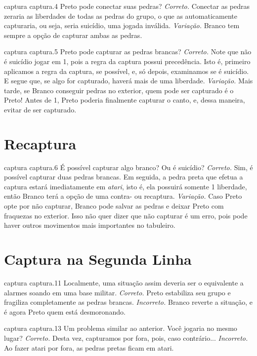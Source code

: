 \emptypage

\problemAnswerDiagram
  {captura}
  {captura.4}
  {Preto pode conectar suas pedras?}
  {\emph{Correto.} Conectar as pedras zeraria as liberdades de todas as pedras do grupo, o que as automaticamente capturaria, ou seja, seria suicídio, uma jogada inválida.}
  {\emph{Variação.} Branco tem sempre a opção de capturar ambas as pedras.}

\problemAnswerDiagram
  {captura}
  {captura.5}
  {Preto pode capturar as pedras brancas?}
  {\emph{Correto.} Note que não é suicídio jogar em 1, pois a regra da captura possui precedência. Isto é, primeiro aplicamos a regra da captura, se possível, e, só depois, examinamos se é suicídio. E segue que, se algo for capturado, haverá mais de uma liberdade.}
  {\emph{Variação.} Mais tarde, se Branco conseguir pedras no exterior, quem pode ser capturado é o Preto! Antes de 1, Preto poderia finalmente capturar o canto, e, dessa maneira, evitar de ser capturado.}

\chapter{Recaptura}

\emptypage

\problemAnswerDiagram
  {captura}
  {captura.6}
  {É possível capturar algo branco? Ou é suicídio?}
  {\emph{Correto.} Sim, é possível capturar duas pedras brancas. Em seguida, a pedra preta que efetua a captura estará imediatamente em \emph{atari}, isto é, ela possuirá somente 1 liberdade, então Branco terá a opção de uma contra- ou recaptura.}
  {\emph{Variação.} Caso Preto opte por não capturar, Branco pode salvar as pedras e deixar Preto com fraquezas no exterior. Isso não quer dizer que não capturar é um erro, pois pode haver outros movimentos mais importantes no tabuleiro.}

\chapter{Captura na Segunda Linha}

\emptypage

\problemAnswerDiagram
  {captura}
  {captura.11}
  {Localmente, uma situação assim deveria ser o equivalente a alarmes soando em uma base militar.}
  {\emph{Correto.} Preto estabiliza seu grupo e fragiliza completamente as pedras brancas.}
  {\emph{Incorreto.} Branco reverte a situação, e é agora Preto quem está desmoronando.}

\problemAnswerDiagram
  {captura}
  {captura.13}
  {Um problema similar ao anterior. Você jogaria no mesmo lugar?}
  {\emph{Correto.} Desta vez, capturamos por fora, pois, caso contrário...}
  {\emph{Incorreto.} Ao fazer atari por fora, as pedras pretas ficam em atari.}

